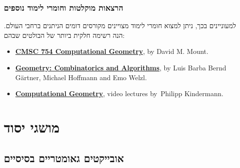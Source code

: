 \documentclass[
]{book}
\theoremstyle{definition}
\theoremstyle{definition}
\theoremstyle{definition}
\theoremstyle{definition}
\theoremstyle{remark}
\begin{document}
\hypertarget{ux5d4ux5e8ux5e6ux5d0ux5d5ux5ea-ux5deux5d5ux5e7ux5dcux5d8ux5d5ux5ea-ux5d5ux5d7ux5d5ux5deux5e8ux5d9-ux5dcux5d9ux5deux5d5ux5d3-ux5e0ux5d5ux5e1ux5e4ux5d9ux5dd}{%
\subsubsection*{הרצאות מוקלטות וחומרי לימוד נוספים}\label{ux5d4ux5e8ux5e6ux5d0ux5d5ux5ea-ux5deux5d5ux5e7ux5dcux5d8ux5d5ux5ea-ux5d5ux5d7ux5d5ux5deux5e8ux5d9-ux5dcux5d9ux5deux5d5ux5d3-ux5e0ux5d5ux5e1ux5e4ux5d9ux5dd}}

למעוניינים בכך, ניתן למצוא חומרי לימוד מצויינים מקורסים דומים הניתנים ברחבי העולם. הנה רשימה חלקית ביותר של הבולטים שבהם:

\begin{itemize}
\item
  \href{http://www.cs.umd.edu/class/spring2020/cmsc754/Lects/cmsc754-spring2020-lects.pdf}{\textbf{CMSC 754 Computational Geometry}}, by David M. Mount.
\item
  \href{https://geometry.inf.ethz.ch/gca18.pdf}{\textbf{Geometry: Combinatorics and Algorithms}}, by Luis Barba Bernd Gärtner, Michael Hoffmann and Emo Welzl.
\item
  \href{https://www.youtube.com/@PhilippKindermann/playlists?view=50\&sort=dd\&shelf_id=2}{\textbf{Computational Geometry}}, video lectures by~Philipp Kindermann.
\end{itemize}

\hypertarget{ux5deux5d5ux5e9ux5d2ux5d9-ux5d9ux5e1ux5d5ux5d3}{%
\section{\texorpdfstring{\textbf{מושגי יסוד}}{מושגי יסוד}}\label{ux5deux5d5ux5e9ux5d2ux5d9-ux5d9ux5e1ux5d5ux5d3}}

\hypertarget{ux5d0ux5d5ux5d1ux5d9ux5d9ux5e7ux5d8ux5d9ux5dd-ux5d2ux5d0ux5d5ux5deux5d8ux5e8ux5d9ux5d9ux5dd-ux5d1ux5e1ux5d9ux5e1ux5d9ux5d9ux5dd}{%
\subsection*{\texorpdfstring{\textbf{אובייקטים גאומטריים בסיסיים}}{אובייקטים גאומטריים בסיסיים}}\label{ux5d0ux5d5ux5d1ux5d9ux5d9ux5e7ux5d8ux5d9ux5dd-ux5d2ux5d0ux5d5ux5deux5d8ux5e8ux5d9ux5d9ux5dd-ux5d1ux5e1ux5d9ux5e1ux5d9ux5d9ux5dd}}
\end{document}
